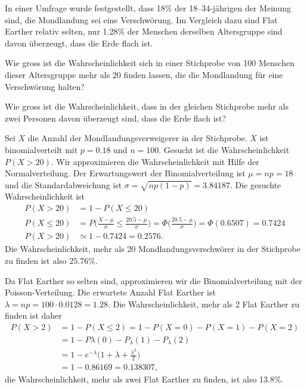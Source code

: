 In einer Umfrage wurde festgestellt, dass 18\% der 18--34-jährigen
der Meinung sind, die Mondlandung sei eine Verschwörung.
Im Vergleich dazu sind Flat Earther relativ selten, nur 1.28\%
der Menschen derselben Altersgruppe sind davon überzeugt, dass
die Erde flach ist.

\begin{teilaufgaben}
\item
Wie gross ist die Wahrscheinlichkeit sich in einer Stichprobe von
100 Menschen dieser Altersgruppe mehr als 20 finden lassen, die die
Mondlandung für eine Verschwörung halten?
\item
Wie gross ist die Wahrscheinlichkeit, dass in der gleichen Stichprobe
mehr als zwei Personen davon überzeugt sind, dass die Erde flach ist?
\end{teilaufgaben}


\begin{loesung}
\begin{teilaufgaben}
\item
Sei $X$ die Anzahl der Mondlandungsverweigerer in der Stichprobe.
$X$ ist binomialverteilt mit $p=0.18$ und $n=100$.
Gesucht ist die Wahrscheinlichkeit $P(X>20)$.
Wir approximieren die Wahrscheinlichkeit mit Hilfe der Normalverteilung.
Der Erwartungswert der Binomialverteilung ist $\mu=np=18$ und die
Standardabweichung ist $\sigma=\sqrt{np(1-p)}=3.84187$.
Die gesuchte Wahrscheinlichkeit ist
\begin{align*}
P(X>20)
&=
1-P(X\le 20)
\\
P(X\le 20)
&=
P\biggl( \frac{X-\mu}{\sigma} \le \frac{20.5-\mu}{\sigma}\biggr)
=
\Phi\biggl(\frac{20.5-\mu}{\sigma}\biggr)
=
\Phi(0.6507)
=
0.7424
\\
P(X>20)&\simeq 1-0.7424 = 0.2576.
\end{align*}
Die Wahrscheinlichkeit, mehr als 20 Mondlandungsverschwörer in der
Stichprobe zu finden ist also $25.76\%$.
\item
Da Flat Earther so selten sind, approximieren wir die Binomialverteilung
mit der Poisson-Verteilung.
Die erwartete Anzahl Flat Earther ist $\lambda = np = 100\cdot 0.0128=1.28$.
Die Wahrscheinlichkeit, mehr als 2 Flat Earther zu finden ist daher
\begin{align*}
P(X > 2)&=1-P(X\le 2) = 1-P(X=0) - P(X=1) - P(X=2)
\\
&=
1-P\lambda(0) -P_\lambda(1) -P_\lambda(2)
\\
&=
1-e^{-\lambda}\biggl(1 + \lambda + \frac{\lambda^2}{2}\biggr)
\\
&=
1- 0.86169 = 0.138307,
\end{align*}
die Wahrscheinlichkeit, mehr als zwei Flat Earther zu finden, ist also
13.8\%.
\qedhere
\end{teilaufgaben}
\end{loesung}

